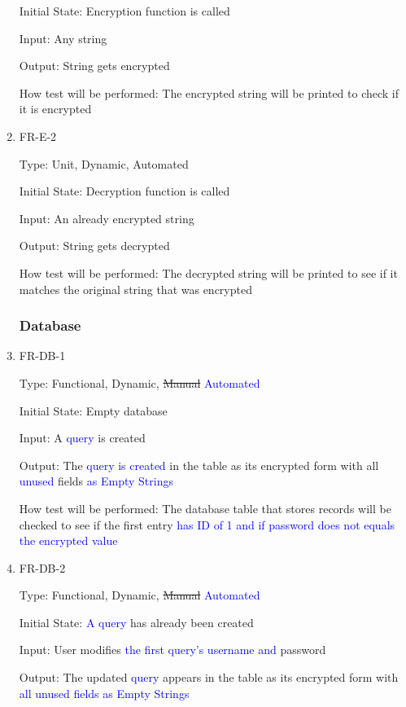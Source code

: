 \documentclass[12pt, titlepage]{article}
\begin{document}
\begin{enumerate}
Initial State: Encryption function is called

Input: Any string

Output: String gets encrypted

How test will be performed: The encrypted string will be printed to check if it is encrypted

\item{FR-E-2\\}

Type: Unit, Dynamic, Automated

Initial State: Decryption function is called

Input: An already encrypted string

Output: String gets decrypted

How test will be performed: The decrypted string will be printed to see if it matches the original string that was encrypted

\subsubsection{Database}

\item{FR-DB-1\\}

Type: Functional, Dynamic, \sout{Manual} \textcolor{blue}{Automated}

Initial State: Empty database

Input: A \textcolor{blue}{query} is created

Output: The \textcolor{blue}{query is created} in the table as its encrypted form with all \textcolor{blue}{unused} fields \textcolor{blue}{as Empty Strings}

How test will be performed: The database table that stores records will be checked to see if the first entry \textcolor{blue}{has ID of 1 and if password does not equals the encrypted value}

\item{FR-DB-2\\}

Type: Functional, Dynamic, \sout{Manual} \textcolor{blue}{Automated}

Initial State: \textcolor{blue}{A query} has already been created

Input: User modifies \textcolor{blue}{the first query's username and} password

Output: The updated \textcolor{blue}{query} appears in the table as its encrypted form with \textcolor{blue}{all unused fields as Empty Strings}


\end{enumerate}
\end{document}
